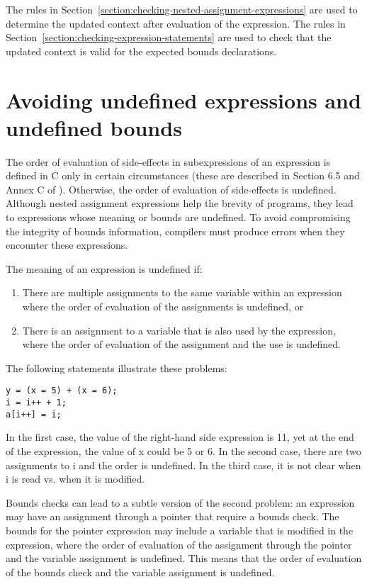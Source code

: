 The rules in Section~\ref{section:checking-nested-assignment-expressions}
are used to determine the updated context after evaluation of the
expression. The rules in Section~\ref{section:checking-expression-statements}
are used to check that the updated
context is valid for the expected bounds declarations.

\section{Avoiding undefined expressions and undefined bounds}
\label{section:avoiding-undefinedness}

The order of evaluation of side-effects in subexpressions of an
expression is defined in C only in certain circumstances (these are
described in Section 6.5 and Annex C of \cite{ISO2011}). Otherwise, the order of
evaluation of side-effects is undefined. Although nested assignment
expressions help the brevity of programs, they lead to expressions whose
meaning or bounds are undefined. To avoid compromising the integrity of
bounds information, compilers must produce errors when they encounter
these expressions.

The meaning of an expression is undefined if:

\begin{enumerate}
\item
  There are multiple assignments to the same variable within an
  expression where the order of evaluation of the assignments is
  undefined, or
\item
  There is an assignment to a variable that is also used by the
  expression, where the order of evaluation of the assignment and the
  use is undefined.
\end{enumerate}

The following statements illustrate these problems:

\begin{verbatim}
y = (x = 5) + (x = 6);
i = i++ + 1;
a[i++] = i;
\end{verbatim}

In the first case, the value of the right-hand side expression is 11,
yet at the end of the expression, the value of x could be 5 or 6. In the
second case, there are two assignments to i and the order is undefined.
In the third case, it is not clear when i is read vs. when it is
modified.

Bounds checks can lead to a subtle version of the second problem: an
expression may have an assignment through a pointer that require a
bounds check. The bounds for the pointer expression may include a
variable that is modified in the expression, where the order of
evaluation of the assignment through the pointer and the variable
assignment is undefined. This means that the order of evaluation of the
bounds check and the variable assignment is undefined.

